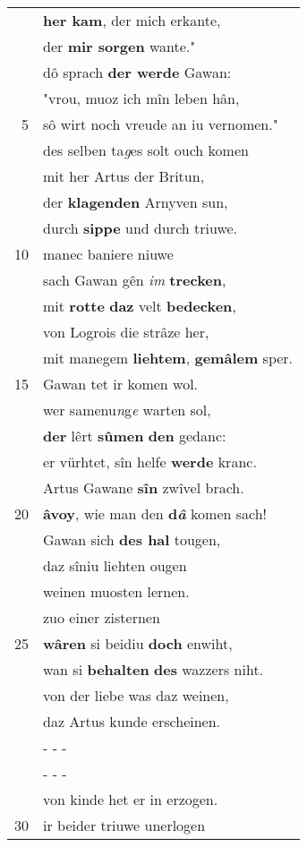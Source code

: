 \documentclass[8pt,a4paper,notitlepage]{article}
\begin{document}
\begin{table}[ht]
\begin{minipage}[t]{0.5\linewidth}
\begin{tabular}{rl}
 & \textbf{her kam}, der mich erkante,\\ 
 & der \textbf{mir sorgen} wante."\\ 
 & dô sprach \textbf{der werde} Gawan:\\ 
 & "vrou, muoz ich mîn leben hân,\\ 
5 & sô wirt noch vreude an iu vernomen."\\ 
 & des selben ta\textit{g}es solt ouch komen\\ 
 & mit her Artus der Britun,\\ 
 & der \textbf{klagenden} Arnyven sun,\\ 
 & durch \textbf{sippe} und durch triuwe.\\ 
10 & manec baniere niuwe\\ 
 & sach Gawan gên \textit{im} \textbf{trecken},\\ 
 & mit \textbf{rotte} \textbf{daz} velt \textbf{bedecken},\\ 
 & von Logrois die strâze her,\\ 
 & mit manegem \textbf{liehtem}, \textbf{gemâlem} sper.\\ 
15 & Gawan tet ir komen wol.\\ 
 & wer samenu\textit{n}g\textit{e} warten sol,\\ 
 & \textbf{der} lêrt \textbf{sûmen} \textbf{den} gedanc:\\ 
 & er vürhtet, sîn helfe \textbf{werde} kranc.\\ 
 & Artus Gawane \textbf{sîn} zwîvel brach.\\ 
20 & \textbf{âvoy}, wie man den \textbf{d\textit{â}} komen sach!\\ 
 & Gawan sich \textbf{des hal} tougen,\\ 
 & daz sîniu liehten ougen\\ 
 & weinen muosten lernen.\\ 
 & zuo einer zisternen\\ 
25 & \textbf{wâren} si beidiu \textbf{doch} enwiht,\\ 
 & wan si \textbf{behalten} \textbf{des} wazzers niht.\\ 
 & von der liebe was daz weinen,\\ 
 & daz Artus kunde erscheinen.\\ 
 & \multicolumn{1}{l}{ - - - }\\ 
 & \multicolumn{1}{l}{ - - - }\\ 
 & von kinde het er in erzogen.\\ 
30 & ir beider triuwe unerlogen\\ 

\end{tabular}
\end{minipage}
\end{table}
\end{document}
